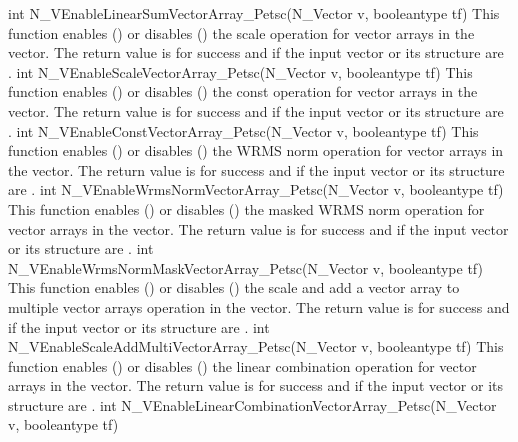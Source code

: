 {
  int N\_VEnableLinearSumVectorArray\_Petsc(N\_Vector v, booleantype tf)
}
{
  This function enables () or disables () the scale
  operation for vector arrays in the {\petsc} vector. The return value is  for
  success and  if the input vector or its  structure are .
}
{
  int N\_VEnableScaleVectorArray\_Petsc(N\_Vector v, booleantype tf)
}
{
  This function enables () or disables () the const
  operation for vector arrays in the {\petsc} vector. The return value is  for
  success and  if the input vector or its  structure are .
}
{
  int N\_VEnableConstVectorArray\_Petsc(N\_Vector v, booleantype tf)
}
{
  This function enables () or disables () the WRMS norm
  operation for vector arrays in the {\petsc} vector. The return value is  for
  success and  if the input vector or its  structure are .
}
{
  int N\_VEnableWrmsNormVectorArray\_Petsc(N\_Vector v, booleantype tf)
}
{
  This function enables () or disables () the masked WRMS
  norm operation for vector arrays in the {\petsc} vector. The return value is
   for success and  if the input vector or its  structure are
  .
}
{
  int N\_VEnableWrmsNormMaskVectorArray\_Petsc(N\_Vector v, booleantype tf)
}
{
  This function enables () or disables () the scale and
  add a vector array to multiple vector arrays operation in the {\petsc} vector. The
  return value is  for success and  if the input vector or its
   structure are .
}
{
  int N\_VEnableScaleAddMultiVectorArray\_Petsc(N\_Vector v, booleantype tf)
}
{
  This function enables () or disables () the linear
  combination operation for vector arrays in the {\petsc} vector. The return value
  is  for success and  if the input vector or its  structure
  are .
}
{
  int N\_VEnableLinearCombinationVectorArray\_Petsc(N\_Vector v,
  booleantype tf)
}
